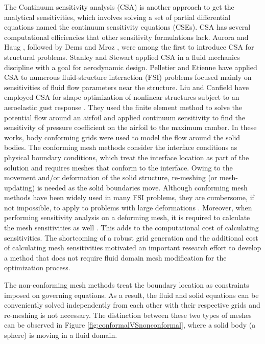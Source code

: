 \documentclass[12pt]{aiaa-pretty}
\begin{document}
The Continuum sensitivity analysis (CSA) is another approach to get the analytical sensitivities, which involves solving a set of partial differential equations named the continuum sensitivity equations (CSEs). CSA has several computational efficiencies that other sensitivity formulations lack. Aurora and Haug \cite{Arora}, followed by Dems and Mroz \cite{Dems-Mroz}, were among the first to introduce CSA for structural problems. Stanley and Stewart \cite{stanley2002design} applied CSA in a fluid mechanics discipline with a goal for aerodynamic design. Pelletier and Etienne have applied CSA to numerous fluid-structure interaction (FSI) problems \cite{etienne2005general} focused mainly on sensitivities of fluid flow parameters near the structure. Liu and Canfield have employed CSA for shape optimization of nonlinear structures subject to an aeroelastic gust response \cite{liu2013equivalence}. They used the finite element method to solve the potential flow around an airfoil and applied continuum sensitivity to find the sensitivity of pressure coefficient on the airfoil to the maximum camber. In these works, body conforming grids were used to model the flow around the solid bodies. The conforming mesh methods consider the interface conditions as physical boundary conditions, which treat the interface location as part of the solution and requires meshes that conform to the interface. Owing to the movement and/or deformation of the solid structure, re-meshing (or mesh-updating) is needed as the solid boundaries move. Although conforming mesh methods have been widely used in many FSI problems, they are cumbersome, if not impossible, to apply to problems with large deformations \cite{sahin2009arbitrary}. Moreover, when performing sensitivity analysis on a deforming mesh, it is required to calculate the mesh sensitivities as well \cite{liu2013boundary}. This adds to the computational cost of calculating  sensitivities. The shortcoming of a robust grid generation and the additional cost of calculating mesh sensitivities motivated an important research effort to develop a method that does not require fluid domain mesh modification for the optimization process.

The non-conforming mesh methods treat the boundary location as constraints imposed on governing equations. As a result, the fluid and solid equations can be conveniently solved independently from each other with their respective grids and re-meshing is not necessary. The distinction between these two types of meshes can be observed in Figure \ref{fig:conformalVSnonconformal}, where a solid body (a sphere) is moving in a fluid domain.
\end{document}
